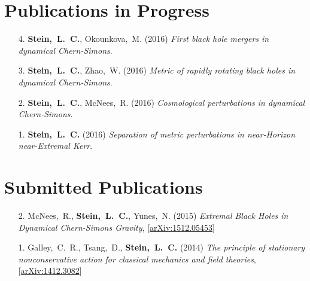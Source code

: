 \newcommand{\arxiv}[1]{[\href{http://arxiv.org/abs/#1}{arXiv:#1}]}

\section{\sc Publications in Progress}
\begin{enumerate}
\item[{4.}]
  {\bf Stein,~L.~C.},
  Okounkova,~M.
  (2016)
  {\it First black hole mergers in dynamical Chern-Simons}.
\item[{3.}]
  {\bf Stein,~L.~C.},
  Zhao,~W.
  (2016)
  {\it Metric of rapidly rotating black holes in dynamical
    Chern-Simons}.
\item[{2.}]
  {\bf Stein,~L.~C.},
  McNees,~R.
  (2016)
  {\it Cosmological perturbations in dynamical Chern-Simons}.
\item[{1.}]
  {\bf Stein,~L.~C.}
  (2016)
  {\it Separation of metric perturbations in near-Horizon
    near-Extremal Kerr}.
\end{enumerate}

\section{\sc Submitted Publications}
\begin{enumerate}
\item[{2.}]
  McNees,~R., {\bf Stein,~L.~C.}, Yunes,~N.
  (2015)
  {\it Extremal Black Holes in Dynamical Chern-Simons Gravity},
  \arxiv{1512.05453}
\item[{1.}] Galley,~C.~R., Tsang,~D., {\bf Stein,~L.~C.} (2014)
  {\it The principle of stationary nonconservative action for
    classical mechanics and field theories},
  \arxiv{1412.3082}
\end{enumerate}


